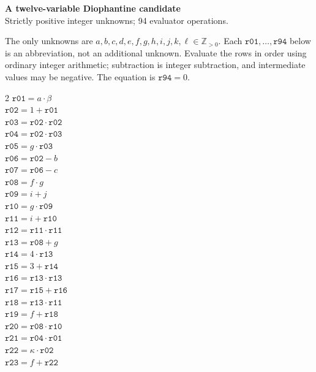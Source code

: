 \documentclass[10pt]{article}
\begin{document}
\begin{center}
{\large\bfseries A twelve-variable Diophantine candidate}\\
{\small Strictly positive integer unknowns; 94 evaluator operations.}
\end{center}
The only unknowns are \(a,b,c,d,e,f,g,h,i,j,k,\ell\in\mathbb Z_{>0}\).
Each \(\mathtt{r01},\ldots,\mathtt{r94}\) below is an abbreviation,
not an additional unknown. Evaluate the rows in order using ordinary integer
arithmetic; subtraction is integer subtraction, and intermediate values may be
negative. The equation is
\(\boxed{\mathtt{r94}=0}\).

\begin{multicols}{2}\small
\(\mathtt{r01} = a \cdot \beta\)\\
\(\mathtt{r02} = 1 + \mathtt{r01}\)\\
\(\mathtt{r03} = \mathtt{r02} \cdot \mathtt{r02}\)\\
\(\mathtt{r04} = \mathtt{r02} \cdot \mathtt{r03}\)\\
\(\mathtt{r05} = g \cdot \mathtt{r03}\)\\
\(\mathtt{r06} = \mathtt{r02} - b\)\\
\(\mathtt{r07} = \mathtt{r06} - c\)\\
\(\mathtt{r08} = f \cdot g\)\\
\(\mathtt{r09} = i + j\)\\
\(\mathtt{r10} = g \cdot \mathtt{r09}\)\\
\(\mathtt{r11} = i + \mathtt{r10}\)\\
\(\mathtt{r12} = \mathtt{r11} \cdot \mathtt{r11}\)\\
\(\mathtt{r13} = \mathtt{r08} + g\)\\
\(\mathtt{r14} = 4 \cdot \mathtt{r13}\)\\
\(\mathtt{r15} = 3 + \mathtt{r14}\)\\
\(\mathtt{r16} = \mathtt{r13} \cdot \mathtt{r13}\)\\
\(\mathtt{r17} = \mathtt{r15} + \mathtt{r16}\)\\
\(\mathtt{r18} = \mathtt{r13} \cdot \mathtt{r11}\)\\
\(\mathtt{r19} = f + \mathtt{r18}\)\\
\(\mathtt{r20} = \mathtt{r08} \cdot \mathtt{r10}\)\\
\(\mathtt{r21} = \mathtt{r04} \cdot \mathtt{r01}\)\\
\(\mathtt{r22} = \kappa \cdot \mathtt{r02}\)\\
\(\mathtt{r23} = f + \mathtt{r22}\)\\

\end{multicols}
\end{document}
